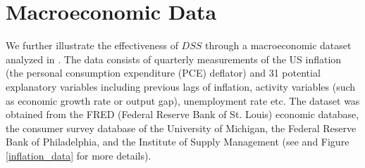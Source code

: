 \documentclass[ba]{imsart}
\numberwithin{equation}{section}
\theoremstyle{plain}
\begin{document}
{\section{Macroeconomic Data}\label{sec:high}

We further illustrate the effectiveness of $DSS$ through a  macroeconomic dataset analyzed  in \cite{kalli_griffin}. The data consists of quarterly measurements of the US inflation (the personal consumption expenditure (PCE) deflator) and 31 potential explanatory variables including previous lags of inflation, activity variables (such as economic growth rate or output gap), unemployment rate etc. The dataset was obtained from the FRED (Federal Reserve Bank of St. Louis) economic database, the consumer survey database of the University of Michigan, the Federal Reserve Bank of Philadelphia, and the Institute of Supply Management (see \cite{kalli_griffin} and Figure \ref{inflation_data} for more details).


}
\end{document}
